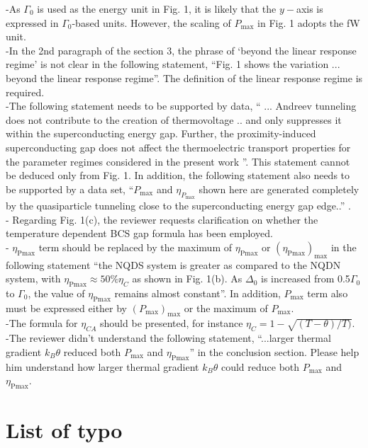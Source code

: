 \documentclass[aip,graphicx,preprint]{revtex4-1}
\begin{document}
-As $\Gamma_0$ is used as the energy unit in Fig. 1, it is likely that the $y-$axis is expressed in $\Gamma_0$-based units. However, the scaling of $P_\text{max}$ in Fig. 1 adopts the fW unit.\\
-In the 2nd paragraph of the section 3, the phrase of `beyond the linear response regime' is not clear in the following statement, ``Fig. 1 shows the variation ... beyond the linear response regime''. The definition of the linear response regime is required.\\
-The following statement needs to be supported by data, `` ... Andreev tunneling does not contribute to the creation of thermovoltage .. and only suppresses it within the superconducting energy gap. Further, the proximity-induced superconducting gap does not affect the thermoelectric transport properties for the parameter regimes considered in the present work ''. This statement cannot be deduced only from Fig. 1. In addition, the following statement also needs to be supported by a data set, ``$P_\text{max}$ and $\eta_{P_\text{max}}$ shown here are generated completely by the quasiparticle tunneling close to the superconducting energy gap edge..'' .\\
- Regarding Fig. 1(c), the reviewer requests clarification on whether the temperature dependent BCS gap formula has been employed.\\
-  $\eta_\text{Pmax}$ term should be replaced by the maximum of $\eta_\text{Pmax}$ or $(\eta_\text{Pmax})_\text{max}$ in the following statement ``the NQDS system is greater as compared to the NQDN system, with $\eta_\text{Pmax} \approx 50 \% \eta_C$ as shown in Fig. 1(b). As $\Delta_0$ is increased from 0.5$\Gamma_0$ to $\Gamma_0$, the value of $\eta_\text{Pmax}$ remains almost constant''.  In addition,  $P_\text{max}$ term  also must be expressed either by $({P_\text{max}})_\text{max}$ or the maximum of $P_\text{max}$.\\
-The formula for $\eta_{CA}$ should be presented, for instance $\eta_C=1-\sqrt{(T-\theta)/T)}$.\\
-The reviewer didn't understand the following statement,  ``...larger thermal gradient $k_B\theta$ reduced both $P_\text{max}$ and $\eta_\text{Pmax}$'' in the conclusion section. Please help him understand how larger thermal gradient $k_B\theta$ could reduce both $P_\text{max}$  and $\eta_\text{Pmax}$.\\


\section{List of typo}
\end{document}
